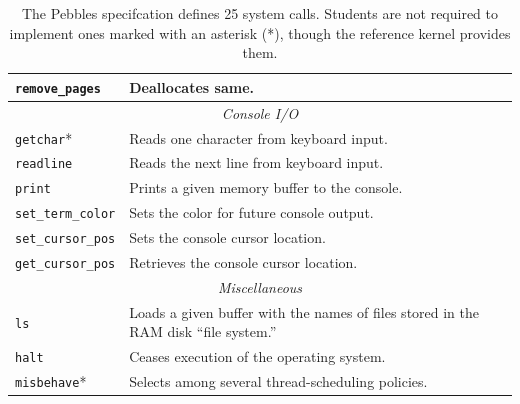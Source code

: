 \begin{table}
\begin{tabular}{|l|p{}|}
                \texttt{remove\_pages} & Deallocates same. \\
                \hline
                \multicolumn{2}{c}{\em Console I/O} \\
                \hline
                \texttt{getchar}* & Reads one character from keyboard input. \\
                \texttt{readline} & Reads the next line from keyboard input. \\
                \texttt{print} & Prints a given memory buffer to the console. \\
                \texttt{set\_term\_color} & Sets the color for future console output. \\
                \texttt{set\_cursor\_pos} & Sets the console cursor location. \\
                \texttt{get\_cursor\_pos} & Retrieves the console cursor location. \\
                \hline
                \multicolumn{2}{c}{\em Miscellaneous} \\
                \hline
                \texttt{ls} & Loads a given buffer with the names of files stored in the RAM disk ``file system.'' \\
                \texttt{halt} & Ceases execution of the operating system. \\
                \texttt{misbehave}* & Selects among several thread-scheduling policies. \\
                \hline
        \end{tabular}
        \caption{The Pebbles specifcation defines 25 system calls. Students are not required to implement ones marked with an asterisk (*), though the reference kernel provides them. }
        \label{tab:syscalls}
\end{table}

